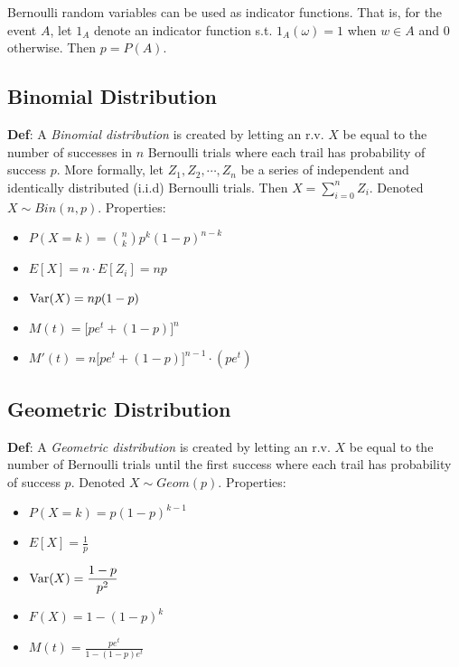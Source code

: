 \documentclass{article}
\newcommand{\var}{\textup{Var}}
\begin{document}
Bernoulli random variables can be used as indicator functions. That is, for the event $A$, let $1_A$ denote an indicator function s.t. $1_A(\omega)=1$ when $w\in A$ and $0$ otherwise. Then $p=P(A)$.

\subsection{Binomial Distribution}

\textbf{Def}: A \emph{Binomial distribution} is created by letting an r.v. $X$ be equal to the number of successes in $n$ Bernoulli trials where each trail has probability of success $p$. More formally, let $Z_1,Z_2,\cdots , Z_n$ be a series of independent and identically distributed (i.i.d) Bernoulli trials. Then $X=\sum_{i=0}^nZ_i$. Denoted $X\sim Bin(n,p)$. Properties:
\begin{itemize}
\item $\displaystyle P(X=k)={n\choose k}p^k(1-p)^{n-k}$
\item $E[X]=n\cdot E\left[Z_i\right]=np$
\item $\var(X)=np(1-p)$
\item $M(t)=\big[pe^{t}+(1-p)\big]^n$
\item $M'(t)=n\big[pe^t+(1-p)\big]^{n-1}\cdot (pe^t)$
\end{itemize}

\subsection{Geometric Distribution}

\textbf{Def}: A \emph{Geometric distribution} is created by letting an r.v. $X$ be equal to the number of Bernoulli trials until the first success where each trail has probability of success $p$. Denoted $X\sim Geom(p)$. Properties:
\begin{itemize}
\item $P(X=k)=p(1-p)^{k-1}$
\item $E[X]=\displaystyle\frac{1}{p}$
\item $\var(X)=\displaystyle\frac{1-p}{p^2}$
\item $F(X)=1-(1-p)^k$
\item $M(t)=\displaystyle\frac{pe^t}{1-(1-p)e^t}$
\end{itemize}
\end{document}
